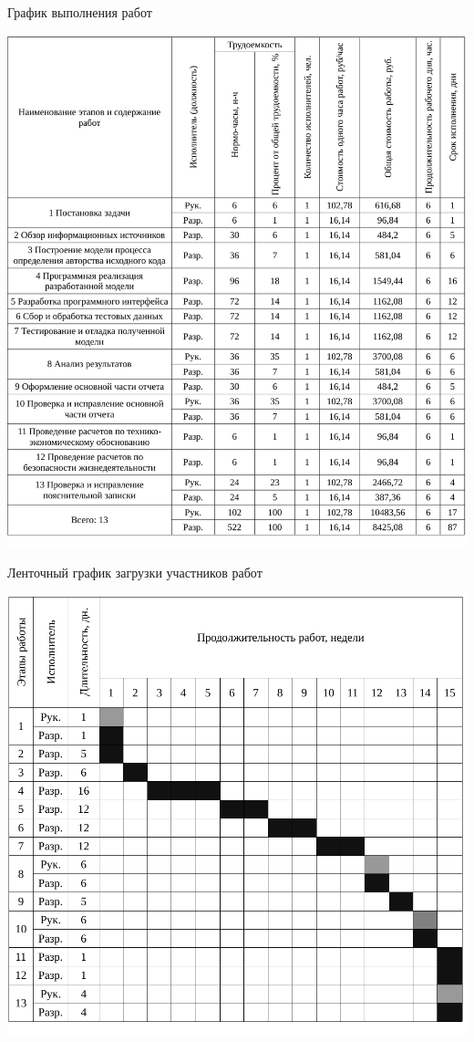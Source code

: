 \begin{table}[!ht]
\caption{График выполнения работ}
\centering
\includegraphics[page=1, width=1\linewidth]{schedule.pdf}
\label{tab:job_is_done_1}
\end{table}


\begin{table}[!ht]
\caption{Ленточный график загрузки участников работ}
\centering
\includegraphics[page=1, width=1\linewidth]{schedule_2.pdf}
\label{tab:job_is_done_2}
\end{table}

